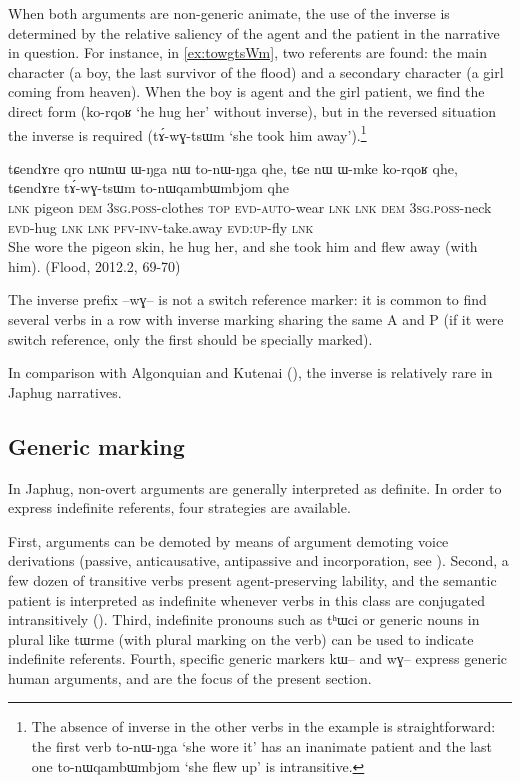 \documentclass[oldfontcommands,oneside,a4paper,11pt]{article}
\newcommand{\ipa}[1]{{\phon \mbox{#1}}} %
\begin{document}
 
When both arguments are non-generic animate, the use of the inverse is determined by the relative saliency of the agent and the patient in the narrative in question. For instance, in \ref{ex:towgtsWm}, two referents are found: the main character (a boy, the last survivor of the flood) and a secondary character (a girl coming from heaven). When the boy is agent and the girl patient, we find the direct form (\ipa{ko-rqoʁ}  `he hug her' without inverse), but in the reversed situation the inverse is required (\ipa{tɤ́-wɣ-tsɯm} `she took him away').\footnote{The absence of inverse in the other verbs in the example is straightforward: the first verb 	\ipa{to-nɯ-ŋga}  `she wore it' has an inanimate patient and the last one \ipa{to-nɯqambɯmbjom}  `she flew up' is intransitive. }

 \begin{exe}
\ex \label{ex:towgtsWm} 
\gll
\ipa{tɕendɤre} 	\ipa{qro} 	\ipa{nɯnɯ} 	\ipa{ɯ-ŋga} 	\ipa{nɯ} 	\ipa{to-nɯ-ŋga} 	\ipa{qhe,}  \ipa{tɕe} 	\ipa{nɯ} 	\ipa{ɯ-mke} 	\ipa{ko-rqoʁ} 	\ipa{qhe,} \ipa{tɕendɤre} 	\ipa{tɤ́-wɣ-tsɯm} 	\ipa{to-nɯqambɯmbjom} 	\ipa{qhe} \\
\textsc{lnk} pigeon \textsc{dem} \textsc{3sg.poss}-clothes \textsc{top} \textsc{evd-auto}-wear \textsc{lnk} \textsc{lnk} \textsc{dem} \textsc{3sg.poss}-neck \textsc{evd}-hug \textsc{lnk} \textsc{lnk} \textsc{pfv-inv}-take.away \textsc{evd:up}-fly \textsc{lnk} \\
\glt She wore the pigeon skin, he hug her, and she took him and flew away (with him). (Flood, 2012.2, 69-70)
\end{exe}

The inverse prefix \ipa{--wɣ--} is not a switch reference marker: it is common to find several verbs in a row with inverse marking sharing the same A and P (if it were switch reference, only the first should be specially marked).

In comparison with Algonquian and Kutenai (\citealt{dryer94inverse}), the inverse is relatively rare in Japhug narratives.

\subsection{Generic marking}  \label{sec:genr.jpg}

In Japhug, non-overt arguments are generally interpreted as definite. In order to express indefinite referents, four strategies are available. 

First, arguments can be demoted by means of argument demoting voice derivations (passive, anticausative,  antipassive and incorporation, see \citealt{jacques12incorp, jacques14antipassive}). Second, a few dozen of transitive verbs present agent-preserving lability, and the semantic patient is interpreted as indefinite whenever verbs in this class are conjugated intransitively (\citealt{jacques12demotion}).  Third, indefinite pronouns such as \ipa{tʰɯci} or generic nouns in plural like \ipa{tɯrme} (with plural marking on the verb) can be used to indicate indefinite referents. Fourth,  specific generic markers \ipa{kɯ--} and \ipa{wɣ--} express generic human arguments, and are the focus of the present section. 
\end{document}
